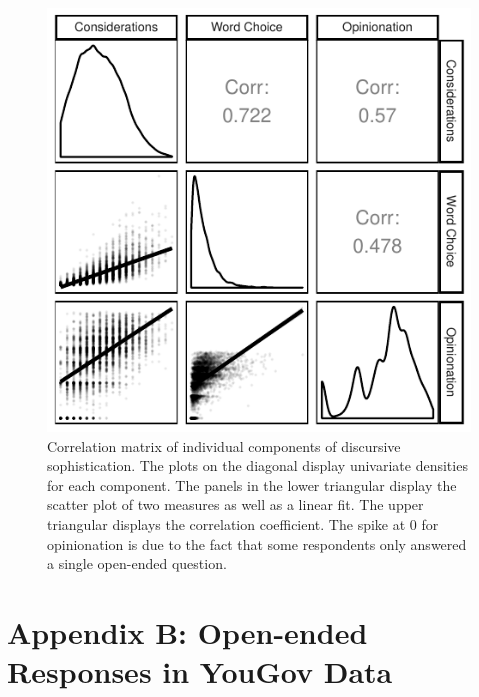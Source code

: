 \documentclass[12pt]{article}
\begin{document}
\begin{figure}[h]\centering
\includegraphics{../fig/corplot_components.pdf}
\caption{Correlation matrix of individual components of discursive sophistication. The plots on the diagonal display univariate densities for each component. The panels in the lower triangular display the scatter plot of two measures as well as a linear fit. The upper triangular displays the correlation coefficient. The spike at 0 for opinionation is due to the fact that some respondents only answered a single open-ended question.}\label{fig:components}
\end{figure}





\clearpage
\section*{Appendix B: Open-ended Responses in YouGov Data}
\renewcommand\thefigure{B.\arabic{figure}}
\renewcommand\thetable{B.\arabic{table}}
\setcounter{figure}{0}
\setcounter{table}{0}
\end{document}
